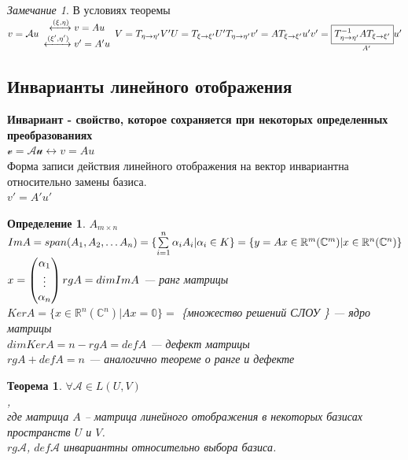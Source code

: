 \documentclass[12pt]{article}
\newtheorem{theorem}{Теорема}[subsection]
\newtheorem{defin}{Определение}[subsection]
\theoremstyle{remark}
\newtheorem*{remark}{Замечание}
\theoremstyle{definition}
\newcommand{\R}{\mathbb R}
\newcommand{\0}{\mathbb{0}}
\newcommand{\A}{\mathcal{A}}
\begin{document}
	\begin{remark}
		В условиях теоремы $v = \A u \begin{array}{c}
			\xleftrightarrow{(\xi, \eta)} v = Au\\
			\xleftrightarrow{(\xi', \eta')} v' = A'u
		\end{array}\\
		V = T_{\eta\rightarrow\eta'} V'\\
		U = T_{\xi\rightarrow\xi'} U'\\
		T_{\eta\rightarrow\eta'}v' = AT_{\xi\rightarrow\xi'}u'\\
		v' = \underset{A'}{\boxed{T^{-1}_{\eta\rightarrow\eta'}AT_{\xi\rightarrow\xi'}}u'}
		$
	\end{remark}
	\subsection{Инварианты линейного отображения}
	\textbf{Инвариант - свойство, которое сохраняется при некоторых определенных преобразованиях}\\
	$\mathscr{v} = \A\mathscr{u} \leftrightarrow v = Au$\\
	Форма записи действия линейного отображения на вектор инвариантна относительно замены базиса.\\
	$v' = A'u'$
	\begin{defin}
		$A_{m\times n}$\\
		$ImA = span(A_1, A_2,\ldots A_n) = \{\sum\limits_{i = 1}^n \alpha_i A_i|\alpha_i\in K\} = \\
		\{y = Ax \in \R^m(\mathbb{C}^m)| x\in \R^n(\mathbb{C}^n)\}$\\
		$x = \begin{pmatrix}
			\alpha_1\\\vdots\\\alpha_n
		\end{pmatrix}\\
		rgA = dimImA$ --- ранг матрицы\\
		$KerA = \{x\in\R^n(\mathbb{C}^n)|Ax = \0 \} =$ \{множество решений СЛОУ \} --- ядро матрицы\\
		$dimKerA = n-rgA = defA$ --- дефект матрицы\\
		$\boxed{rgA + defA = n}$ --- аналогично теореме о ранге и дефекте
	\end{defin}
	\begin{theorem}
		$\forall \A \in L(U, V)$\\
		\fbox{
			\parbox{73px}{
				$rg\A = rg A$\\
				$def\A = def A$
			}
		}, \\
		где матрица $A$ -- матрица линейного отображения в некоторых базисах пространств $U$ и $V$.\\
		$rg\A$, $def\A$ инвариантны относительно выбора базиса.
	\end{theorem}
\end{document}
